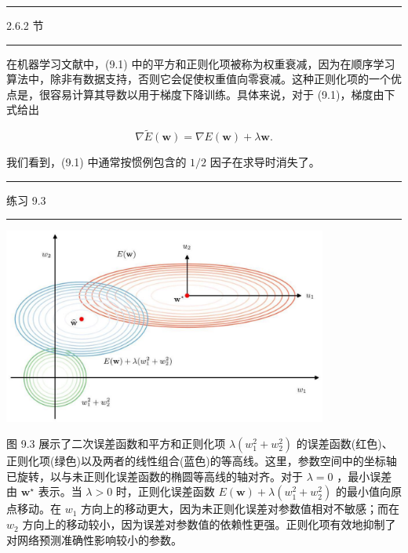 \documentclass[10pt]{article}
\newcommand{\HRule}{\begin{center}\rule{0.9\linewidth}{0.2mm}\end{center}}
\begin{document}
\HRule

2.6.2 节

\HRule

在机器学习文献中，(9.1) 中的平方和正则化项被称为权重衰减，因为在顺序学习算法中，除非有数据支持，否则它会促使权重值向零衰减。这种正则化项的一个优点是，很容易计算其导数以用于梯度下降训练。具体来说，对于 (9.1)，梯度由下式给出

\[
\nabla \widetilde{E}\left( \mathbf{w}\right)  = \nabla E\left( \mathbf{w}\right)  + \lambda \mathbf{w}. \tag{9.5}
\]

我们看到，(9.1) 中通常按惯例包含的 \(1/2\) 因子在求导时消失了。

\HRule

练习 9.3

\HRule

\begin{center}
\includegraphics[max width=0.8\textwidth]{images/0194e279-9b28-703a-88f4-c3ac21e2010d_280_268_353_1103_666_0.jpg}
\end{center}
\hspace*{3em} 

图 9.3 展示了二次误差函数和平方和正则化项 \(\lambda \left( {{w}_{1}^{2} + {w}_{2}^{2}}\right)\) 的误差函数(红色)、正则化项(绿色)以及两者的线性组合(蓝色)的等高线。这里，参数空间中的坐标轴已旋转，以与未正则化误差函数的椭圆等高线的轴对齐。对于 \(\lambda  = 0\) ，最小误差由 \({\mathbf{w}}^{ \star  }\) 表示。当 \(\lambda  > 0\) 时，正则化误差函数 \(E\left( \mathbf{w}\right)  + \lambda \left( {{w}_{1}^{2} + {w}_{2}^{2}}\right)\) 的最小值向原点移动。在 \({w}_{1}\) 方向上的移动更大，因为未正则化误差对参数值相对不敏感；而在 \({w}_{2}\) 方向上的移动较小，因为误差对参数值的依赖性更强。正则化项有效地抑制了对网络预测准确性影响较小的参数。
\end{document}
